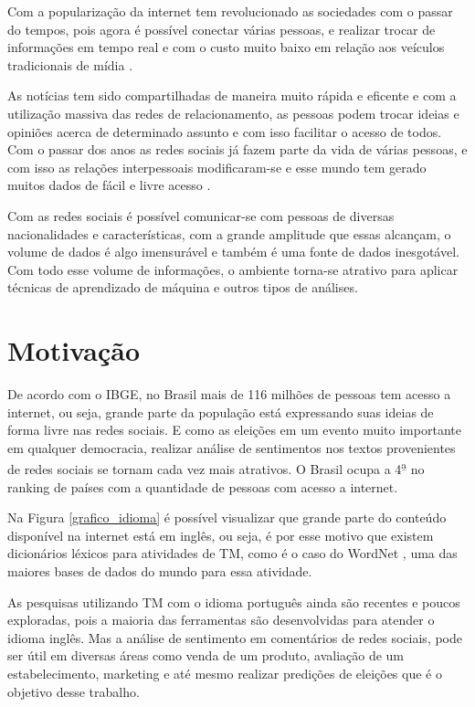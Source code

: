 Com a popularização da internet tem revolucionado as sociedades com o passar do tempos,
pois agora é possível conectar várias pessoas, e realizar trocar de informações em tempo real
e com o custo muito baixo em relação aos veículos tradicionais de mídia \cite{song2014analyzing}. 

As notícias tem sido compartilhadas de maneira muito rápida e eficente e com a utilização massiva das 
redes de relacionamento, as pessoas podem trocar ideias e opiniões acerca de determinado assunto e com isso facilitar
o acesso de todos. Com o passar dos anos as redes sociais já fazem parte da vida de várias pessoas, e com isso as relações 
interpessoais modificaram-se e esse mundo tem gerado muitos dados de fácil e livre acesso \cite{5194581}.

Com as redes sociais é possível comunicar-se com pessoas de diversas nacionalidades e características, com
a grande amplitude que essas alcançam, o volume de dados é algo imensurável e também é uma fonte de dados
inesgotável. Com todo esse volume de informações, o ambiente torna-se atrativo para aplicar técnicas de aprendizado de
máquina e outros tipos de análises.
\section{Motivação}

De acordo com o \acrshort{IBGE}, no Brasil mais de 116 milhões de pessoas tem acesso a internet, ou seja, grande parte da população está expressando suas ideias
de forma livre nas redes sociais. E como as eleições em um evento muito importante em qualquer democracia, realizar análise de sentimentos nos textos 
provenientes de redes sociais se tornam cada vez mais atrativos. O Brasil ocupa a 4\textsuperscript{\b{a}} no ranking de países com a quantidade de pessoas com acesso a internet\cite{ILS}.

Na Figura \ref{grafico_idioma} é possível visualizar que grande parte do conteúdo disponível na internet está em inglês, ou seja, é por esse motivo que
existem dicionários léxicos para atividades de \acrshort{TM}, como é o caso do WordNet \cite{miller1995wordnet}, uma das maiores bases de dados do mundo para essa atividade. 

As pesquisas utilizando \acrshort{TM} com o idioma português ainda são recentes e poucos exploradas, pois a maioria das ferramentas são desenvolvidas para atender o idioma inglês. Mas a análise
de sentimento em comentários de redes sociais, pode ser útil em diversas áreas como venda de um produto, avaliação de um estabelecimento, marketing e até mesmo realizar predições de eleições que é o objetivo desse trabalho.



